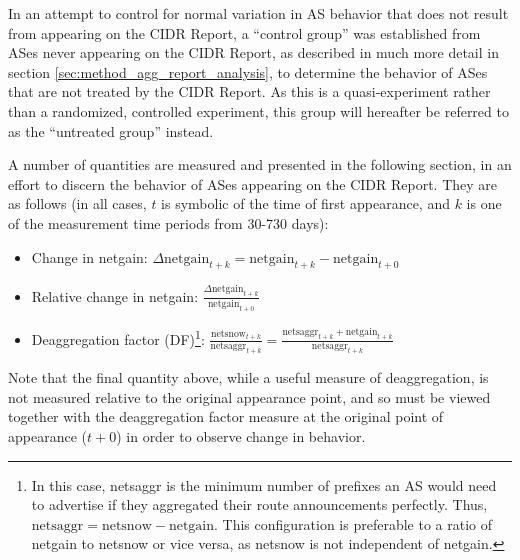 In an attempt to control for normal variation in AS behavior that does not
result from appearing on the CIDR Report, a ``control group'' was established
from ASes never appearing on the CIDR Report, as described in much more detail
in section \ref{sec:method_agg_report_analysis}, to determine the behavior of
ASes that are not treated by the CIDR Report. As this is a quasi-experiment
rather than a randomized, controlled experiment, this group will hereafter be
referred to as the ``untreated group'' instead.

A number of quantities are measured and presented in the following section, in
an effort to discern the behavior of ASes appearing on the CIDR Report. They
are as follows (in all cases, $t$ is symbolic of the time of first appearance,
and $k$ is one of the measurement time periods from 30-730 days):
\begin{itemize}
\item{Change in netgain: $\Delta\textrm{netgain}_{t+k} = \textrm{netgain}_{t+k}
    - \textrm{netgain}_{t+0}$}
\item{Relative change in netgain: $\frac{\Delta\textrm{netgain}_{t+k}}
    {\textrm{netgain}_{t+0}}$}
\item{Deaggregation factor (DF)\footnote{In this case, netsaggr is the minimum
number of prefixes an AS would need to advertise if they aggregated their route
announcements perfectly. Thus, $\textrm{netsaggr} = \textrm{netsnow} -
\textrm{netgain}$. This configuration is preferable to a ratio of netgain to
netsnow or vice versa, as netsnow is not independent of netgain.}:
$\frac{\textrm{netsnow}_{t+k}}{\textrm{netsaggr}_{t+k}} = 
\frac{\textrm{netsaggr}_{t+k} +
\textrm{netgain}_{t+k}}{\textrm{netsaggr}_{t+k}}$}
\end{itemize}

Note that the final quantity above, while a useful measure of deaggregation,
is not measured relative to the original appearance point, and so must be
viewed together with the deaggregation factor measure at the original point of
appearance ($t+0$) in order to observe change in behavior.

